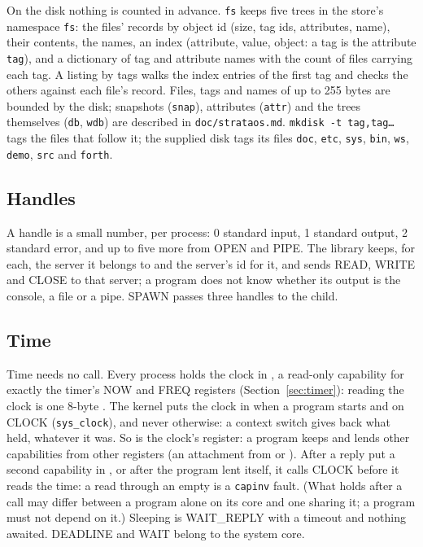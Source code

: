 On the disk nothing is counted in advance. \texttt{fs} keeps five trees in the store's namespace
\texttt{fs}: the files' records by object id (size, tag ids, attributes, name), their contents, the
names, an index (attribute, value, object: a tag is the attribute \texttt{tag}), and a dictionary of
tag and attribute names with the count of files carrying each tag. A listing by tags walks the
index entries of the first tag and checks the others against each file's record. Files, tags and
names of up to 255 bytes are bounded by the disk; snapshots (\texttt{snap}), attributes
(\texttt{attr}) and the trees themselves (\texttt{db}, \texttt{wdb}) are described in
\texttt{doc/strataos.md}. \texttt{mkdisk -t tag,tag\ldots} tags the files that follow it; the supplied
disk tags its files \texttt{doc}, \texttt{etc}, \texttt{sys}, \texttt{bin}, \texttt{ws},
\texttt{demo}, \texttt{src} and \texttt{forth}.

\subsection{Handles}
A handle is a small number, per process: 0 standard input, 1 standard output, 2 standard error, and up
to five more from OPEN and PIPE. The library keeps, for each, the server it belongs to and the
server's id for it, and sends READ, WRITE and CLOSE to that server; a program does not know whether its
output is the console, a file or a pipe. SPAWN passes three handles to the child.

\subsection{Time}\label{sec:os-time}
Time needs no call. Every process holds the clock in , a read-only capability for exactly the
timer's NOW and FREQ registers (Section~\ref{sec:timer}): reading the clock is one 8-byte .
The kernel puts the clock in  when a program starts and on CLOCK (\texttt{sys\_clock}), and
never otherwise: a context switch gives back what  held, whatever it was. So  is the
clock's register: a program keeps and lends other capabilities from other registers (an attachment
from  or ). After a reply put a second capability in , or after the program
lent  itself, it calls CLOCK before it reads the time: a read through an empty  is a
\texttt{capinv} fault. (What  holds after a call may differ between a program alone on its
core and one sharing it; a program must not depend on it.)
Sleeping is WAIT\_REPLY with a timeout and nothing awaited. DEADLINE and WAIT belong to the system
core.

